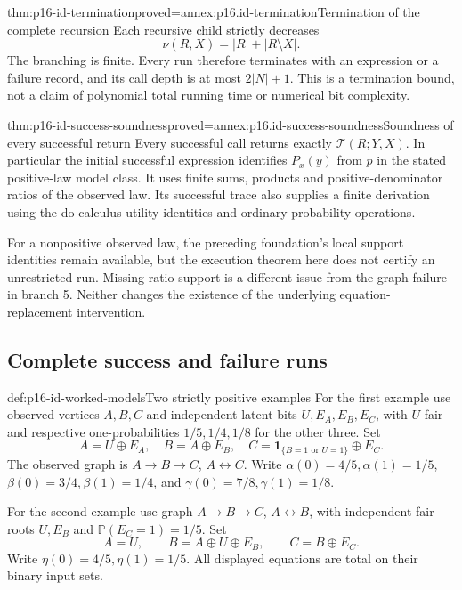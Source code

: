 \begin{hbtheorem}{thm:p16-id-termination}{proved=annex:p16.id-termination}{Termination of the complete recursion}
Each recursive child strictly decreases
\[
 \nu(R,X)=|R|+|R\setminus X|.
\]
The branching is finite. Every run therefore terminates with an
expression or a failure record, and its call depth is at most
\(2|N|+1\). This is a termination bound, not a claim of polynomial
total running time or numerical bit complexity.
\end{hbtheorem}

\begin{hbtheorem}{thm:p16-id-success-soundness}{proved=annex:p16.id-success-soundness}{Soundness of every successful return}
Every successful call returns exactly \(\mathcal T(R;Y,X)\).
In particular the initial successful expression identifies \(P_x(y)\)
from \(p\) in the stated positive-law model class. It uses finite
sums, products and positive-denominator ratios of the observed law.
Its successful trace also supplies a finite derivation using the
do-calculus utility identities and ordinary probability operations.

For a nonpositive observed law, the preceding foundation's local
support identities remain available, but the execution theorem here
does not certify an unrestricted run. Missing ratio support is a
different issue from the graph failure in branch 5. Neither changes
the existence of the underlying equation-replacement intervention.
\end{hbtheorem}

\subsection{Complete success and failure runs}

\begin{hbdefinition}{def:p16-id-worked-models}{Two strictly positive examples}
For the first example use observed vertices \(A,B,C\) and independent
latent bits \(U,E_A,E_B,E_C\), with \(U\) fair and respective
one-probabilities \(1/5,1/4,1/8\) for the other three. Set
\[
 A=U\oplus E_A,\quad B=A\oplus E_B,\quad
 C=\mathbf1_{\{B=1\text{ or }U=1\}}\oplus E_C.
\]
The observed graph is \(A\to B\to C\), \(A\leftrightarrow C\).
Write \(\alpha(0)=4/5,\alpha(1)=1/5\),
\(\beta(0)=3/4,\beta(1)=1/4\), and
\(\gamma(0)=7/8,\gamma(1)=1/8\).

For the second example use graph \(A\to B\to C\),
\(A\leftrightarrow B\), with independent fair roots \(U,E_B\)
and \(\mathbb P(E_C=1)=1/5\). Set
\[
 A=U,\qquad B=A\oplus U\oplus E_B,\qquad C=B\oplus E_C.
\]
Write \(\eta(0)=4/5,\eta(1)=1/5\).
All displayed equations are total on their binary input sets.
\end{hbdefinition}

